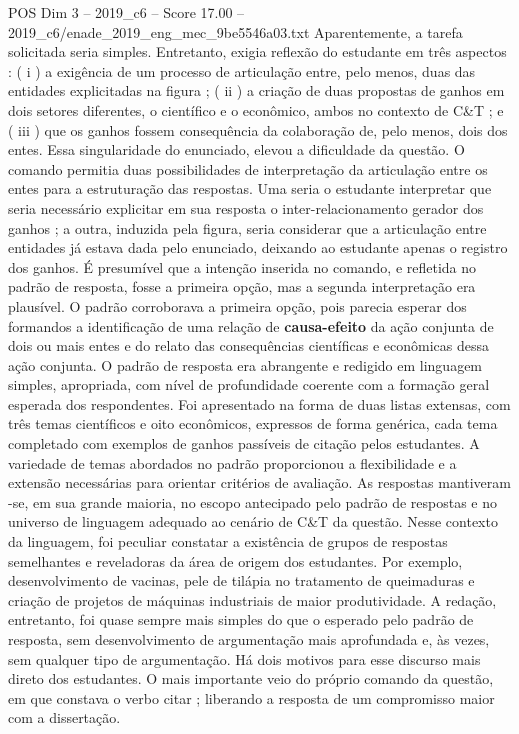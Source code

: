 \begin{textsample}{POS Dim 3 – 2019\_c6 – Score 17.00 – 2019\_c6/enade\_2019\_eng\_mec\_9be5546a03.txt}
Aparentemente, a tarefa solicitada seria simples.
Entretanto, exigia reflexão do estudante em três aspectos : ( i ) a exigência de um processo de articulação entre, pelo menos, duas das entidades explicitadas na figura ; ( ii ) a criação de duas propostas de ganhos em dois setores diferentes, o científico e o econômico, ambos no contexto de C\&T ; e ( iii ) que os ganhos fossem consequência da colaboração de, pelo menos, dois dos entes.
Essa singularidade do enunciado, elevou a dificuldade da questão.
O comando permitia duas possibilidades de interpretação da articulação entre os entes para a estruturação das respostas.
Uma seria o estudante interpretar que seria necessário explicitar em sua resposta o inter-relacionamento gerador dos ganhos ; a outra, induzida pela figura, seria considerar que a articulação entre entidades já estava dada pelo enunciado, deixando ao estudante apenas o registro dos ganhos.
É presumível que a intenção inserida no comando, e refletida no padrão de resposta, fosse a primeira opção, mas a segunda interpretação era plausível.
O padrão corroborava a primeira opção, pois parecia esperar dos formandos a identificação de uma relação de \textbf{causa-efeito} da ação conjunta de dois ou mais entes e do relato das consequências científicas e econômicas dessa ação conjunta.
O padrão de resposta era abrangente e redigido em linguagem simples, apropriada, com nível de profundidade coerente com a formação geral esperada dos respondentes.
Foi apresentado na forma de duas listas extensas, com três temas científicos e oito econômicos, expressos de forma genérica, cada tema completado com exemplos de ganhos passíveis de citação pelos estudantes.
A variedade de temas abordados no padrão proporcionou a flexibilidade e a extensão necessárias para orientar critérios de avaliação.
As respostas mantiveram -se, em sua grande maioria, no escopo antecipado pelo padrão de respostas e no universo de linguagem adequado ao cenário de C\&T da questão.
Nesse contexto da linguagem, foi peculiar constatar a existência de grupos de respostas semelhantes e reveladoras da área de origem dos estudantes.
Por exemplo, desenvolvimento de vacinas, pele de tilápia no tratamento de queimaduras e criação de projetos de máquinas industriais de maior produtividade.
A redação, entretanto, foi quase sempre mais simples do que o esperado pelo padrão de resposta, sem desenvolvimento de argumentação mais aprofundada e, às vezes, sem qualquer tipo de argumentação.
Há dois motivos para esse discurso mais direto dos estudantes.
O mais importante veio do próprio comando da questão, em que constava o verbo citar ; liberando a resposta de um compromisso maior com a dissertação.

\end{textsample}
